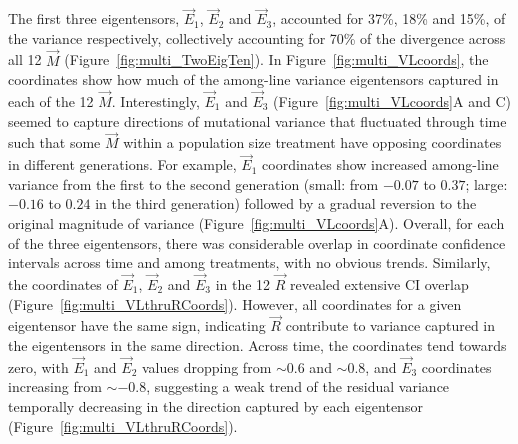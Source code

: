 The first three eigentensors, $\vec{E}_1$, $\vec{E}_2$ and $\vec{E}_3$, accounted for 37\%, 18\% and 15\%, of the variance respectively, collectively accounting for 70\% of the divergence across all 12 $\vec{M}$ (Figure~\ref{fig:multi_TwoEigTen}). In Figure~\ref{fig:multi_VLcoords}, the coordinates show how much of the among-line variance eigentensors captured in each of the 12 $\vec{M}$. Interestingly, $\vec{E}_1$ and $\vec{E}_3$ (Figure~\ref{fig:multi_VLcoords}A and C) seemed to capture directions of mutational variance that fluctuated through time such that some $\vec{M}$ within a population size treatment have opposing coordinates in different generations. For example, $\vec{E}_1$ coordinates show increased among-line variance from the first to the second generation (small: from $-0.07$ to $0.37$; large: $-0.16$ to $0.24$ in the third generation) followed by a gradual reversion to the original magnitude of variance (Figure~\ref{fig:multi_VLcoords}A). Overall, for each of the three eigentensors, there was considerable overlap in coordinate confidence intervals across time and among treatments, with no obvious trends. Similarly, the coordinates of $\vec{E}_1$, $\vec{E}_2$ and $\vec{E}_3$ in the 12 $\vec{R}$ revealed extensive CI overlap (Figure~\ref{fig:multi_VLthruRCoords}). However, all coordinates for a given eigentensor have the same sign, indicating $\vec{R}$ contribute to variance captured in the eigentensors in the same direction. Across time, the coordinates tend towards zero, with $\vec{E}_1$ and $\vec{E}_2$ values dropping from $\sim0.6$ and $\sim0.8$, and $\vec{E}_3$ coordinates increasing from $\sim -0.8$, suggesting a weak trend of the residual variance temporally decreasing in the direction captured by each eigentensor (Figure~\ref{fig:multi_VLthruRCoords}). \par

